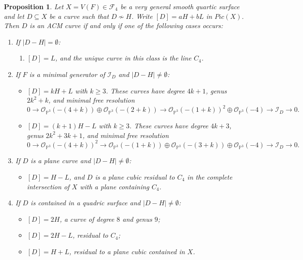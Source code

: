 \documentclass[12pt,reqno]{amsart}
\theoremstyle{plain}
\newtheorem{prop}[theorem]{Proposition}
\theoremstyle{definition}
\theoremstyle{remark}
\theoremstyle{definition}
\newcommand{\PP}{\mathds{P}}
\newcommand{\PPP}{\PP^{3}}
\newcommand{\ii}{\mathscr{I}}
\newcommand{\oo}{\mathcal{O}}
\begin{document}
\begin{prop}\label{prop1}
Let $X=V(F)\in\mathcal{F}_4$ be a very general smooth quartic surface and let
$D\subseteq X$ be a curve such that $D\not\sim H$. Write $[D]=aH+bL$ in $Pic(X)$. Then
$D$ is an ACM curve if and only if one of the following cases occurs:
\begin{enumerate}[label=(\roman*)]
    \item If $|D-H|=\emptyset$:
    \begin{enumerate}
        \item[(a)] $[D]=L$, and the unique curve in this class is the line $C_4$.
    \end{enumerate}

    \item If $F$ is a minimal generator of $\ii_D$ and $|D-H|\neq\emptyset$:
    \begin{itemize}
        \item[(a)] $[D]=kH+L$ with $k\geq3$. These curves have degree $4k+1$, genus
        $2k^2+k$, and minimal free resolution
        \[
        0\to \oo_{\PPP}(-(4+k))\oplus \oo_{\PPP}(-(2+k))
        \to \oo_{\PPP}(-(1+k))^2\oplus \oo_{\PPP}(-4)
        \to \ii_D\to0.
        \]
        \item[(b)] $[D]=(k+1)H-L$ with $k\geq3$. These curves have degree $4k+3$, genus
        $2k^2+3k+1$, and minimal free resolution
        \[
        0\to \oo_{\PPP}(-(4+k))^2
        \to \oo_{\PPP}(-(1+k))\oplus \oo_{\PPP}(-(3+k))\oplus \oo_{\PPP}(-4)
        \to \ii_D\to0.
        \]
    \end{itemize}

    \item If $D$ is a plane curve and $|D-H|\neq\emptyset$:
    \begin{itemize}
        \item[(a)] $[D]=H-L$, and $D$ is a plane cubic residual to $C_4$ in the complete
        intersection of $X$ with a plane containing $C_4$.
    \end{itemize}

    \item If $D$ is contained in a quadric surface and $|D-H|\neq\emptyset$:
    \begin{itemize}
        \item[(a)] $[D]=2H$, a curve of degree $8$ and genus $9$;
        \item[(b)] $[D]=2H-L$, residual to $C_4$;
        \item[(c)] $[D]=H+L$, residual to a plane cubic contained in $X$.
    \end{itemize}


\end{enumerate}
\end{prop}
\end{document}

